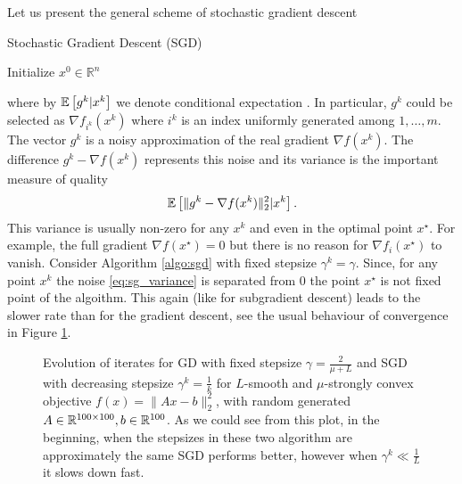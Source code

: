 Let us present the general scheme of stochastic gradient descent
\begin{algorithm}
    \caption{Stochastic Gradient Descent (SGD)}
    \label{algo:sgd}
    \begin{algorithmic}
        \STATE Initialize $x^0\in\mathbb{R}^n$
        \ENDFOR
    \end{algorithmic}
\end{algorithm}
where by $\mathbb{E}\left[g^k|x^k\right]$ we denote conditional expectation \cite[Chapter IV, Section $4$]{kolmogorov1933grundbegriffe}.
In particular, $g^k$ could be selected as $\nabla f_{i^k}(x^k)$ where $i^k$ is an index uniformly generated among $1,\ldots, m$. The vector $g^k$ is a noisy approximation of the real gradient $\nabla f(x^k)$. The difference $g^k- \nabla f(x^k)$ represents this noise and its variance is the important measure of quality
\begin{equation}\label{eq:sg_variance}
    \mathbb{E}\left[\|g^k - \nabla f(x^k)\|_2^2|x^k\right].
\end{equation}
This variance is usually non-zero for any $x^k$ and even in the optimal point $x^\star$. For example, the full gradient $\nabla f(x^\star) = 0$ but there is no reason for $\nabla f_i(x^\star)$ to vanish. {\color{blue} Consider Algorithm \ref{algo:sgd} with fixed stepsize $\gamma^k = \gamma$. Since, for any point $x^k$ the noise \eqref{eq:sg_variance} is separated from $0$ the point $x^\star$ is not fixed point of the algoithm.} This again (like for subgradient descent) leads to the slower rate than for the gradient descent, see the usual behaviour of convergence in Figure \ref{fig:sgd_vs_gd}.

\begin{figure}[H]
    \centering
    
    \caption{Evolution of iterates for GD with fixed stepsize $\gamma = \frac{2}{\mu + L}$ and SGD with decreasing stepsize $\gamma^k = \frac{1}{k}$ for $L$-smooth and $\mu$-strongly convex objective $f(x) = \|Ax-b\|_2^2$, with random generated $A\in\mathbb{R}^{100\times100},b\in\mathbb{R}^{100}$. As we could see from this plot, in the beginning, when the stepsizes in these two algorithm are approximately the same SGD performs better, however when $\gamma^k\ll \frac{1}{L}$ it slows down fast.}
    \label{fig:sgd_vs_gd}
\end{figure}

